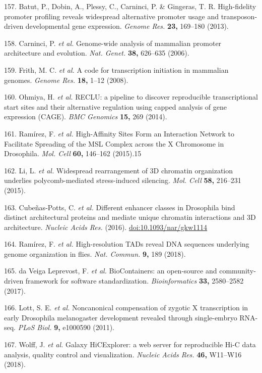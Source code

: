 \documentclass[11pt,twoside]{MPIthesis}
\theoremstyle{definition}
\theoremstyle{definition}
\theoremstyle{definition}
\theoremstyle{remark}
\begin{document}
157. Batut, P., Dobin, A., Plessy, C., Carninci, P. \& Gingeras, T. R.
High-fidelity promoter profiling reveals widespread alternative promoter
usage and transposon-driven developmental gene expression. \emph{Genome
Res.} \textbf{23,} 169--180 (2013).

158. Carninci, P. \emph{et al.} Genome-wide analysis of mammalian
promoter architecture and evolution. \emph{Nat. Genet.} \textbf{38,}
626--635 (2006).

159. Frith, M. C. \emph{et al.} A code for transcription initiation in
mammalian genomes. \emph{Genome Res.} \textbf{18,} 1--12 (2008).

160. Ohmiya, H. \emph{et al.} RECLU: a pipeline to discover reproducible
transcriptional start sites and their alternative regulation using
capped analysis of gene expression (CAGE). \emph{BMC Genomics}
\textbf{15,} 269 (2014).

161. Ramírez, F. \emph{et al.} High-Affinity Sites Form an Interaction
Network to Facilitate Spreading of the MSL Complex across the X
Chromosome in Drosophila. \emph{Mol. Cell} \textbf{60,} 146--162
(2015).15

162. Li, L. \emph{et al.} Widespread rearrangement of 3D chromatin
organization underlies polycomb-mediated stress-induced silencing.
\emph{Mol. Cell} \textbf{58,} 216--231 (2015).

163. Cubeñas-Potts, C. \emph{et al.} Different enhancer classes in
Drosophila bind distinct architectural proteins and mediate unique
chromatin interactions and 3D architecture. \emph{Nucleic Acids Res.}
(2016). \url{doi:10.1093/nar/gkw1114}

164. Ramírez, F. \emph{et al.} High-resolution TADs reveal DNA sequences
underlying genome organization in flies. \emph{Nat. Commun.} \textbf{9,}
189 (2018).

165. da Veiga Leprevost, F. \emph{et al.} BioContainers: an open-source
and community-driven framework for software standardization.
\emph{Bioinformatics} \textbf{33,} 2580--2582 (2017).

166. Lott, S. E. \emph{et al.} Noncanonical compensation of zygotic X
transcription in early Drosophila melanogaster development revealed
through single-embryo RNA-seq. \emph{PLoS Biol.} \textbf{9,} e1000590
(2011).

167. Wolff, J. \emph{et al.} Galaxy HiCExplorer: a web server for
reproducible Hi-C data analysis, quality control and visualization.
\emph{Nucleic Acids Res.} \textbf{46,} W11--W16 (2018).
\end{document}
